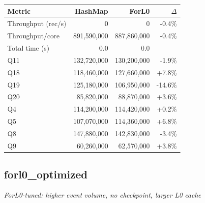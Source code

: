 \documentclass[11pt,a4paper]{article}
\begin{document}
\begin{table}[h]
\centering
\begin{tabular}{lrrr}
\toprule
\textbf{Metric} & \textbf{HashMap} & \textbf{ForL0} & $\Delta$ \\
\midrule

Throughput (rec/s) & 0 & 0 & -0.4\% \\

Throughput/core & 891,590,000 & 887,860,000 & -0.4\% \\

Total time (s) & 0.0 & 0.0 &  \\

  Q11 & 132,720,000 & 130,200,000 & -1.9\% \\

  Q18 & 118,460,000 & 127,660,000 & +7.8\% \\

  Q19 & 125,180,000 & 106,950,000 & -14.6\% \\

  Q20 & 85,820,000 & 88,870,000 & +3.6\% \\

  Q4 & 114,200,000 & 114,420,000 & +0.2\% \\

  Q5 & 107,070,000 & 114,360,000 & +6.8\% \\

  Q8 & 147,880,000 & 142,830,000 & -3.4\% \\

  Q9 & 60,260,000 & 62,570,000 & +3.8\% \\

\bottomrule
\end{tabular}
\end{table}


\subsection{forl0\_optimized}

\textit{ForL0-tuned: higher event volume, no checkpoint, larger L0 cache}
\end{document}
